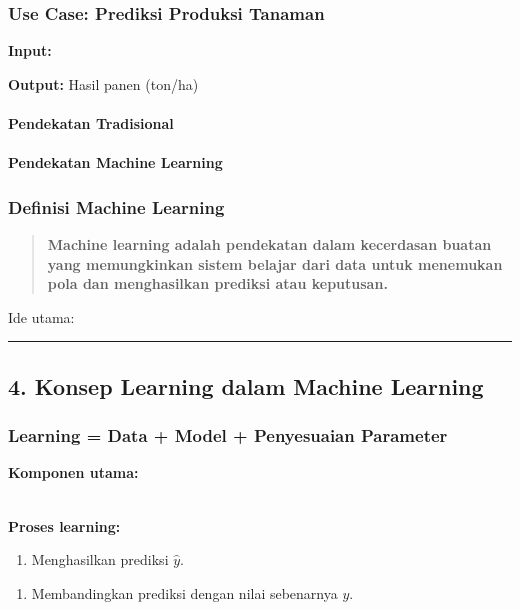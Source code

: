 \documentclass[12pt,a4paper]{article}
\begin{document}
\subsubsection{Use Case: Prediksi Produksi Tanaman}

\textbf{Input:}


\textbf{Output:} Hasil panen (ton/ha)


\paragraph{Pendekatan Tradisional}

\paragraph{Pendekatan Machine Learning}

\subsubsection{Definisi Machine Learning}

\begin{quote}
\textbf{Machine learning adalah pendekatan dalam kecerdasan buatan yang memungkinkan sistem belajar dari data untuk menemukan pola dan menghasilkan prediksi atau keputusan.}\end{quote}


Ide utama:


\hrule


\subsection{4. Konsep Learning dalam Machine Learning}

\subsubsection{Learning = Data + Model + Penyesuaian Parameter}

\textbf{Komponen utama:}


\\[
\hat{y} = f(X)
\\]


\textbf{Proses learning:}

\begin{enumerate}
\item Menghasilkan prediksi $\hat{y}$.
\end{enumerate}

\begin{enumerate}
\item Membandingkan prediksi dengan nilai sebenarnya $y$.
\end{enumerate}
\end{document}
